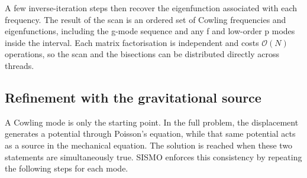 \documentclass[]{aa}
\begin{document}
A few inverse-iteration steps then recover the eigenfunction associated with each frequency. The result of the scan is an ordered set of Cowling frequencies and eigenfunctions, including the g-mode sequence and any f and low-order p modes inside the interval. Each matrix factorisation is independent and costs $\mathcal{O}(N)$ operations, so the scan and the bisections can be distributed directly across threads.

\subsection{Refinement with the gravitational source}
\label{sec:refine}

A Cowling mode is only the starting point. In the full problem, the displacement generates a potential through Poisson's equation, while that same potential acts as a source in the mechanical equation. The solution is reached when these two statements are simultaneously true. SISMO enforces this consistency by repeating the following steps for each mode.
\end{document}

